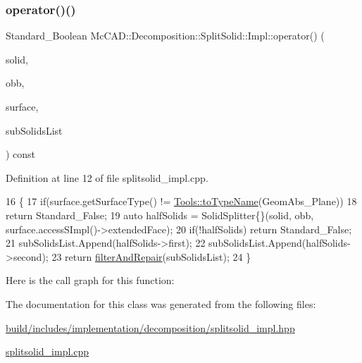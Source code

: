 \subsubsection{\texorpdfstring{operator()()}{operator()()}\hspace{0.1cm}{\footnotesize\ttfamily [2/2]}}
{\footnotesize\ttfamily Standard\+\_\+\+Boolean Mc\+C\+A\+D\+::\+Decomposition\+::\+Split\+Solid\+::\+Impl\+::operator() (\begin{DoxyParamCaption}\item[{const Topo\+D\+S\+\_\+\+Solid \&}]{solid,  }\item[{const Bnd\+\_\+\+O\+BB \&}]{obb,  }\item[{const \hyperlink{classMcCAD_1_1Geometry_1_1BoundSurface}{Geometry\+::\+Bound\+Surface} \&}]{surface,  }\item[{Top\+Tools\+\_\+\+H\+Sequence\+Of\+Shape \&}]{sub\+Solids\+List }\end{DoxyParamCaption}) const}



Definition at line 12 of file splitsolid\+\_\+impl.\+cpp.


\begin{DoxyCode}
16                                                        \{
17     \textcolor{keywordflow}{if}(surface.getSurfaceType() != \hyperlink{namespaceMcCAD_1_1Tools_a2c3c43d2878c73f69424e7b32f87bb2b}{Tools::toTypeName}(GeomAbs\_Plane))
18         \textcolor{keywordflow}{return} Standard\_False;
19     \textcolor{keyword}{auto} halfSolids = SolidSplitter\{\}(solid, obb, surface.accessSImpl()->extendedFace);
20     \textcolor{keywordflow}{if}(!halfSolids) \textcolor{keywordflow}{return} Standard\_False;
21     subSolidsList.Append(halfSolids->first);
22     subSolidsList.Append(halfSolids->second);
23     \textcolor{keywordflow}{return} \hyperlink{classMcCAD_1_1Decomposition_1_1SplitSolid_1_1Impl_ab12750fdedddaba9cbb2c953e82755da}{filterAndRepair}(subSolidsList);
24 \}
\end{DoxyCode}
Here is the call graph for this function\+:


The documentation for this class was generated from the following files\+:\begin{DoxyCompactItemize}
\item 
\hyperlink{build_2includes_2implementation_2decomposition_2splitsolid__impl_8hpp}{build/includes/implementation/decomposition/splitsolid\+\_\+impl.\+hpp}\item 
\hyperlink{splitsolid__impl_8cpp}{splitsolid\+\_\+impl.\+cpp}\end{DoxyCompactItemize}
